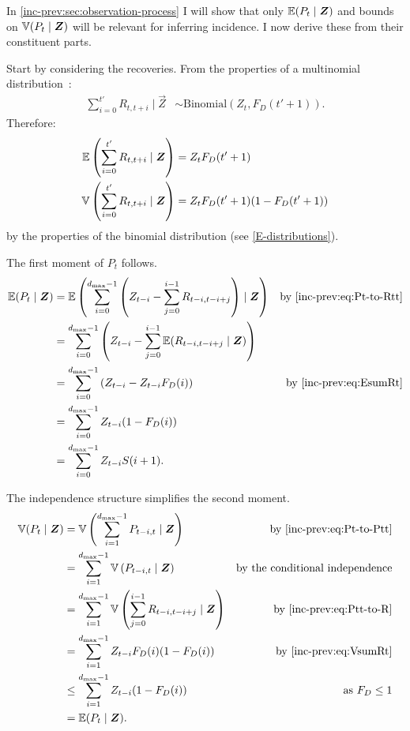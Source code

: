 \documentclass[thesis.tex]{subfiles}
\begin{document}
In \cref{inc-prev:sec:observation-process} I will show that only $\operatorname{\mathbb{E}}(P_t \mid \bm{Z})$ and bounds on $\operatorname{\mathbb{V}}(P_t \mid \bm{Z})$ will be relevant for inferring incidence.
I now derive these from their constituent parts.

Start by considering the recoveries.
From the properties of a multinomial distribution~\autocite{alamAnalysis}:
\begin{align}
  \sum_{i=0}^{t'} R_{t,t+i} \mid \vec{Z} &\sim \text{Binomial}(Z_t, F_D(t'+1)). \label{inc-prev:eq:binomialRt}
\end{align}
Therefore:
\begin{align}
  \operatorname{\mathbb{E}} \left( \sum_{i=0}^{t'} R_{t,t+i} \mid \bm{Z} \right) &= Z_t F_D(t'+1) \label{inc-prev:eq:EsumRt} \\
  \operatorname{\mathbb{V}} \left( \sum_{i=0}^{t'} R_{t,t+i} \mid \bm{Z} \right) &= Z_t F_D(t'+1) (1 - F_D(t'+1)) \label{inc-prev:eq:VsumRt}
\end{align}
by the properties of the binomial distribution (see \cref{E-distributions}).

The first moment of $P_t$ follows.
\begin{align}
\E(P_t \mid \vec{Z})
  &= \E\left(\sum_{i=0}^{d_\text{max}-1} \left( Z_{t-i} - \sum_{j=0}^{i-1} R_{t-i,t-i+j} \right) \mid \vec{Z} \right) &\text{by \cref{inc-prev:eq:Pt-to-Rtt}}\\
  &= \sum_{i=0}^{d_\text{max}-1} \left( Z_{t-i} - \sum_{j=0}^{i-1} \E( R_{t-i,t-i+j} \mid \vec{Z}) \right) \\
  &= \sum_{i=0}^{d_\text{max}-1} \left( Z_{t-i} - Z_{t-i} F_D(i) \right) &\text{by \cref{inc-prev:eq:EsumRt}}\\
  &= \sum_{i=0}^{d_\text{max}-1} Z_{t-i} (1 - F_D(i)) \\
  &= \sum_{i=0}^{d_\text{max}-1} Z_{t-i} S(i+1) \label{inc-prev:eq:EPt}.
\end{align}

The independence structure simplifies the second moment.
\begin{align}
\V(P_t \mid \vec{Z})
  &= \V\left(\sum_{i=1}^{d_\text{max}-1} P_{t-i,t} \mid \vec{Z} \right) &\text{by \cref{inc-prev:eq:Pt-to-Ptt}} \\
  &= \sum_{i=1}^{d_\text{max}-1} \V\left(P_{t-i,t} \mid \vec{Z} \right) &\text{by the conditional independence} \\
  &= \sum_{i=1}^{d_\text{max}-1} \V\left(\sum_{j=0}^{i-1} R_{t-i,t-i+j} \mid \vec{Z} \right) &\text{by~\cref{inc-prev:eq:Ptt-to-R}}\\
  &= \sum_{i=1}^{d_\text{max}-1} Z_{t-i} F_D(i) (1 - F_D(i)) &\text{by~\cref{inc-prev:eq:VsumRt}} \\
  &\leq \sum_{i=1}^{d_\text{max}-1} Z_{t-i} (1 - F_D(i)) &\text{as $F_D \leq 1$}\\
  &= \E(P_t \mid \vec{Z}). \label{inc-prev:eq:boundVPt}
\end{align}
\end{document}
